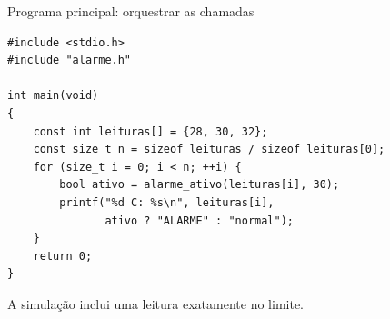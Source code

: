 \begin{frame}[fragile]{Programa principal: orquestrar as chamadas}
\begin{lstlisting}
#include <stdio.h>
#include "alarme.h"

int main(void)
{
    const int leituras[] = {28, 30, 32};
    const size_t n = sizeof leituras / sizeof leituras[0];
    for (size_t i = 0; i < n; ++i) {
        bool ativo = alarme_ativo(leituras[i], 30);
        printf("%d C: %s\n", leituras[i],
               ativo ? "ALARME" : "normal");
    }
    return 0;
}
\end{lstlisting}
\small A simulação inclui uma leitura exatamente no limite.
\end{frame}

